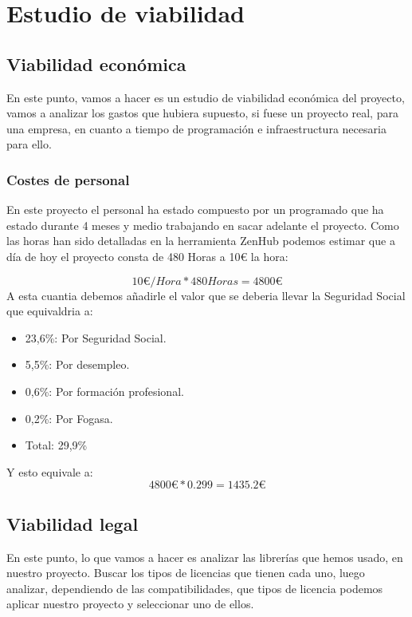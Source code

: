 \section{Estudio de viabilidad}

\subsection{Viabilidad económica}
En este punto, vamos a hacer es un estudio de viabilidad económica del proyecto, vamos a analizar los gastos que hubiera supuesto, si fuese un proyecto real, para una empresa, en cuanto a tiempo de programación e infraestructura necesaria para ello.
\subsubsection{Costes de personal}
En este proyecto el personal ha estado compuesto por un programado que ha estado durante 4 meses y medio trabajando en sacar adelante el proyecto.
Como las horas han sido detalladas en la herramienta ZenHub podemos estimar que a día de hoy el proyecto consta de 480 Horas a 10\euro{} la hora:

\[10{\euro{}} /Hora*480Horas=4800{\euro{}} \]
A esta cuantia debemos añadirle el valor que se deberia llevar la Seguridad Social que equivaldria a:
\begin{itemize}
\item 23,6\%: Por Seguridad Social.
\item 5,5\%: Por desempleo.
\item 0,6\%: Por formación profesional.
\item 0,2\%: Por Fogasa.
\item Total: 29,9\% 
\end{itemize}
Y esto equivale a: 
\[4800\euro{}*0.299=1435.2\euro{}\]

\subsection{Viabilidad legal}
En este punto, lo que vamos a hacer es analizar las librerías que hemos usado, en nuestro proyecto. Buscar los tipos de licencias que tienen cada uno, luego analizar, dependiendo de las compatibilidades, que tipos de licencia podemos aplicar nuestro proyecto y seleccionar uno de ellos.

